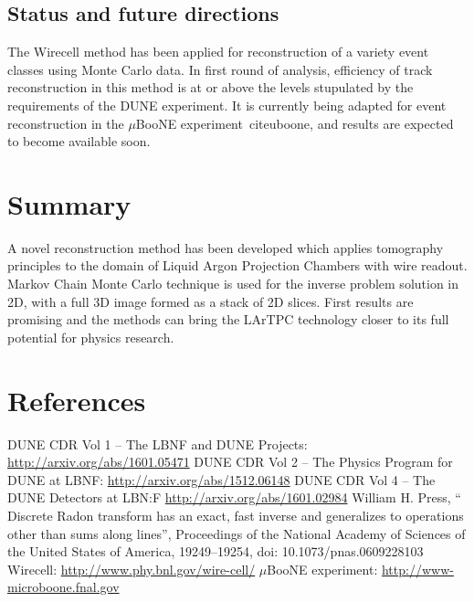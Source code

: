 \documentclass[a4paper]{jpconf}
\begin{document}
\subsection{Status and future directions}
The Wirecell method has been applied for reconstruction of a variety event classes using Monte Carlo data. In first round of analysis, efficiency of track reconstruction
in this method is at or above the levels stupulated by the requirements of the DUNE experiment.
It is currently being adapted for
event reconstruction in the $\mu$BooNE experiment~cite{uboone}, and results are expected to become available soon.

\section{Summary}
A novel reconstruction method has been developed which applies tomography principles to the domain of Liquid Argon Projection Chambers with
wire readout. Markov Chain Monte Carlo technique is used for the inverse problem solution in 2D, with a full 3D image formed as a stack of 2D slices.
First results are promising and the methods can bring the LArTPC technology closer to its full potential for physics research.


\section*{References}
\begin{thebibliography}{9}
 DUNE CDR Vol 1 -- The LBNF and DUNE Projects: \url{http://arxiv.org/abs/1601.05471}
 DUNE CDR Vol 2 -- The Physics Program for DUNE at LBNF: \url{http://arxiv.org/abs/1512.06148}
  DUNE CDR Vol 4 -- The DUNE Detectors at LBN:F \url{http://arxiv.org/abs/1601.02984}
  William H. Press, `` Discrete Radon transform has an exact, fast inverse and generalizes to operations other than sums along lines'', Proceedings of the National Academy of Sciences of the United States of America, 19249–19254, doi: 10.1073/pnas.0609228103
 Wirecell: \url{http://www.phy.bnl.gov/wire-cell/}
 $\mu$BooNE experiment: \url{http://www-microboone.fnal.gov}

\end{thebibliography}
\end{document}
